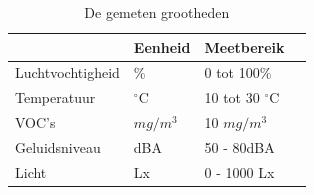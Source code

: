 \begin{table}[ht]
    \centering
    \begin{tabular}{l||l|l|l}
        & Eenheid & Meetbereik\\
        \hline
        Luchtvochtigheid & \%          & 0 tot 100\%           & \cite{palonen1993effects}  \\
        Temperatuur      & $^{\circ}$C & 10 tot 30 $^{\circ}$C & \cite{palonen1993effects}  \\
        VOC's            & \(mg/m^3\)  & 10 \(mg/m^3\)         & \cite{voc-luchtkwaliteit}  \\
        Geluidsniveau    & dBA         & 50 - 80dBA            & \cite{geluid-levels}       \\
        Licht            & Lx          & 0 - 1000 Lx           & \cite{lightingIndorWorkspaces}
    \end{tabular}
    \caption{De gemeten grootheden}
    \label{tab:grootheden}
\end{table}

 